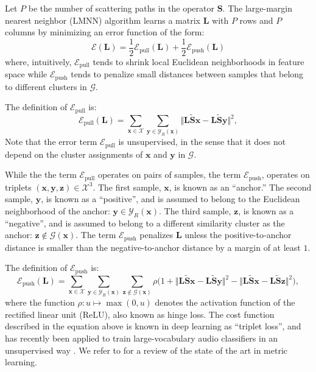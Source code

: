 \documentclass{bmcart}
\begin{document}
Let $P$ be the number of scattering paths in the operator $\mathbf{S}$. The large-margin nearest neighbor (LMNN) algorithm learns a matrix $\mathbf{L}$ with $P$ rows and $P$ columns by minimizing an error function of the form:
\begin{equation}
\mathcal{E}(\mathbf{L}) = \frac{1}{2} \mathcal{E}_{\textrm{pull}} (\mathbf{L}) + \frac{1}{2} \mathcal{E}_{\textrm{push}} (\mathbf{L})
\end{equation}
where, intuitively, $\mathcal{E}_{\textrm{pull}}$ tends to shrink local Euclidean neighborhoods in feature space while $\mathcal{E}_{\textrm{push}}$ tends to penalize small distances between samples that belong to different clusters in $\mathcal{G}$.

The definition of $\mathcal{E}_{\textrm{pull}}$ is:
\begin{equation}
\mathcal{E}_{\textrm{pull}} (\mathbf{L}) =
\sum_{\boldsymbol{x}\in\mathcal{X}}
\sum_{\boldsymbol{y}\in\mathcal{Y}_R (\boldsymbol{x})}
\big\Vert
\mathbf{L}\mathbf{\widetilde{S}}\boldsymbol{x} - \mathbf{L}\mathbf{\widetilde{S}}\boldsymbol{y}
\big\Vert^2,
\end{equation}
Note that the error term $\mathcal{E}_\textrm{pull}$ is unsupervised, in the sense that it does not depend on the cluster assignments of $\boldsymbol{x}$ and $\boldsymbol{y}$ in $\mathcal{G}$.

While the the term $\mathcal{E}_{\textrm{pull}}$ operates on pairs of samples, the term $\mathcal{E}_{\textrm{push}}$, operates on triplets $(\boldsymbol{x}, \boldsymbol{y}, \boldsymbol{z})\in\mathcal{X}^3$.
The first sample, $\boldsymbol{x}$, is known as an ``anchor.''
The second sample, $\boldsymbol{y}$, is known as a ``positive'', and is assumed to belong to the Euclidean neighborhood of the anchor: $\boldsymbol{y} \in \mathcal{Y}_R (\boldsymbol{x})$.
The third sample, $\boldsymbol{z}$, is known as a ``negative'', and is assumed to belong to a different similarity cluster as the anchor: $\boldsymbol{z}\not\in\mathcal{G}(\boldsymbol{x})$.
The term $\mathcal{E}_{\textrm{push}}$ penalizes $\mathbf{L}$ unless the positive-to-anchor distance is smaller than the negative-to-anchor distance by a margin of at least $1$.

The definition of $\mathcal{E}_{\textrm{push}}$ is:
\begin{equation}
\mathcal{E}_{\textrm{push}} (\mathbf{L}) =
\sum_{\boldsymbol{x}\in\mathcal{X}}
\sum_{\boldsymbol{y}\in\mathcal{Y}_R (\boldsymbol{x})}
\sum_{\boldsymbol{z}\not\in\mathcal{G}(\boldsymbol{x})}
\rho
\Big(
1 +
\big\Vert
\mathbf{L}\mathbf{\widetilde{S}}\boldsymbol{x} - \mathbf{L}\mathbf{\widetilde{S}}\boldsymbol{y}
\big\Vert^2
-
\big\Vert
\mathbf{L}\mathbf{\widetilde{S}}\boldsymbol{x} - \mathbf{L}\mathbf{\widetilde{S}}\boldsymbol{z}
\big\Vert^2
\Big),
\end{equation}
where the function $\rho : u \mapsto \max (0, u)$ denotes the activation function of the rectified linear unit (ReLU), also known as hinge loss.
The cost function described in the equation above is known in deep learning as ``triplet loss'', and has recently been applied to train large-vocabulary audio classifiers in an unsupervised way \cite{jansen2018icassp}.
We refer to \cite{bellet2015book} for a review of the state of the art in metric learning.
\end{document}
